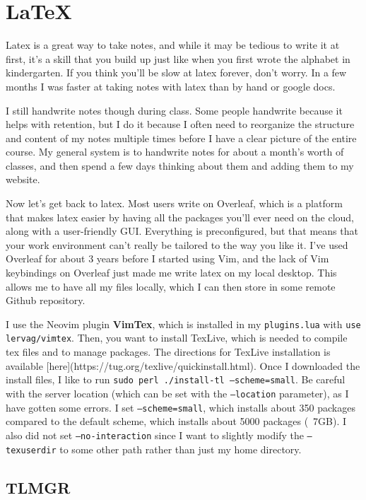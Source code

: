 \section{LaTeX} 

  Latex is a great way to take notes, and while it may be tedious to write it at first, it's a skill that you build up just like when you first wrote the alphabet in kindergarten. If you think you'll be slow at latex forever, don't worry. In a few months I was faster at taking notes with latex than by hand or google docs. 

  I still handwrite notes though during class. Some people handwrite because it helps with retention, but I do it because I often need to reorganize the structure and content of my notes multiple times before I have a clear picture of the entire course. My general system is to handwrite notes for about a month's worth of classes, and then spend a few days thinking about them and adding them to my website.  

  Now let's get back to latex. Most users write on Overleaf, which is a platform that makes latex easier by having all the packages you'll ever need on the cloud, along with a user-friendly GUI. Everything is preconfigured, but that means that your work environment can't really be tailored to the way you like it. I've used Overleaf for about 3 years before I started using Vim, and the lack of Vim keybindings on Overleaf just made me write latex on my local desktop. This allows me to have all my files locally, which I can then store in some remote Github repository.  

  I use the Neovim plugin \textbf{VimTex}, which is installed in my \texttt{plugins.lua} with \texttt{use lervag/vimtex}. Then, you want to install TexLive, which is needed to compile tex files and to manage packages. The directions for TexLive installation is available [here](https://tug.org/texlive/quickinstall.html). Once I downloaded the install files, I like to run \texttt{sudo perl ./install-tl --scheme=small}. Be careful with the server location (which can be set with the \texttt{--location} parameter), as I have gotten some errors. I set \texttt{--scheme=small}, which installs about 350 packages compared to the default scheme, which installs about 5000 packages (~7GB). I also did not set \texttt{--no-interaction} since I want to slightly modify the \texttt{--texuserdir} to some other path rather than just my home directory. 

\subsection{TLMGR}


